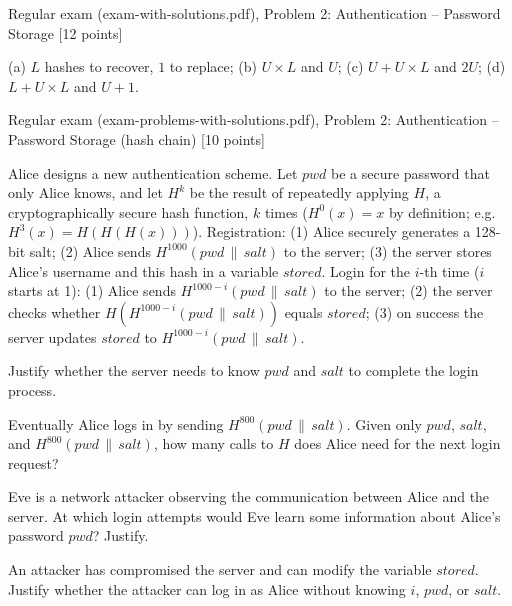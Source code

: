 \documentclass[12pt, a4paper]{article}
\begin{document}
\begin{practicebox}{Regular exam (exam-with-solutions.pdf), Problem 2: Authentication -- Password Storage [12 points]}
\begin{answerbox}
(a) $L$ hashes to recover, $1$ to replace; (b) $U \times L$ and $U$; (c) $U + U \times L$ and $2U$; (d) $L + U \times L$ and $U + 1$.
\end{answerbox}
\end{practicebox}

\begin{practicebox}{Regular exam (exam-problems-with-solutions.pdf), Problem 2: Authentication -- Password Storage (hash chain) [10 points]}
\begin{problembox}
Alice designs a new authentication scheme. Let $pwd$ be a secure password that only Alice knows, and let $H^{k}$ be the result of repeatedly applying $H$, a cryptographically secure hash function, $k$ times ($H^{0}(x) = x$ by definition; e.g. $H^{3}(x) = H(H(H(x)))$). Registration: (1) Alice securely generates a 128-bit salt; (2) Alice sends $H^{1000}(pwd \,\|\, salt)$ to the server; (3) the server stores Alice's username and this hash in a variable $stored$. Login for the $i$-th time ($i$ starts at 1): (1) Alice sends $H^{1000-i}(pwd \,\|\, salt)$ to the server; (2) the server checks whether $H(H^{1000-i}(pwd \,\|\, salt))$ equals $stored$; (3) on success the server updates $stored$ to $H^{1000-i}(pwd \,\|\, salt)$.
\begin{tightitem}
\item[(a)] [2p] Justify whether the server needs to know $pwd$ and $salt$ to complete the login process.
\item[(b)] [2p] Eventually Alice logs in by sending $H^{800}(pwd \,\|\, salt)$. Given only $pwd$, $salt$, and $H^{800}(pwd \,\|\, salt)$, how many calls to $H$ does Alice need for the next login request?
\item[(c)] [3p] Eve is a network attacker observing the communication between Alice and the server. At which login attempts would Eve learn some information about Alice's password $pwd$? Justify.
\item[(d)] [3p] An attacker has compromised the server and can modify the variable $stored$. Justify whether the attacker can log in as Alice without knowing $i$, $pwd$, or $salt$.
\end{tightitem}
\end{problembox}


\end{practicebox}
\end{document}
